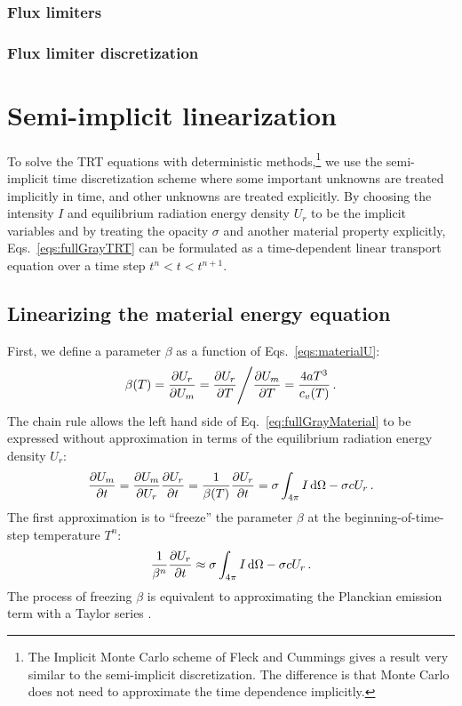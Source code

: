 \subsubsection{Flux limiters}

\subsubsection{Flux limiter discretization}
\cite{Ols2007}

\section{Semi-implicit linearization}

To solve the TRT equations with deterministic methods,\footnote{The Implicit
Monte Carlo scheme of Fleck and Cummings \cite{Fle1971} gives a result very
similar to the semi-implicit discretization. The difference is that Monte
Carlo does not need to approximate the time dependence implicitly.} we use the
semi-implicit time
discretization scheme \cite{Kno1999a,Kno2001,Low2004} where some important
unknowns are treated implicitly in
time, and other unknowns are treated explicitly. By choosing the intensity $I$
and equilibrium radiation energy density $U_r$ to be the implicit variables and 
by treating the opacity $\sigma$ and another material property explicitly,
Eqs.~\eqref{eqs:fullGrayTRT} can be formulated as a time-dependent linear
transport equation over a time step $t^n < t < t^{n+1}$.

\subsection{Linearizing the material energy equation}
First, we define a parameter $\beta$ as a function of Eqs.~\eqref{eqs:materialU}:
\begin{equation} \label{eq:beta}
  \beta(T) = \frac{\partial U_r}{\partial U_m} 
  = \frac{\partial U_r}{\partial T} \Bigg/ \frac{\partial U_m}{\partial T}
  = \frac{4 a T^3}{c_v(T)} \,.
\end{equation}
The chain rule allows the left hand side of Eq.~\eqref{eq:fullGrayMaterial} to be
expressed without approximation in terms of the equilibrium radiation energy
density $U_r$:
\begin{equation*}
  \frac{\partial U_m}{\partial t} = \frac{\partial U_m}{\partial U_r} \frac{\partial U_r}{\partial t} = \frac{1}{\beta(T)}
  \frac{\partial U_r}{\partial t} = \sigma \int_{4\pi}  I \mathop{}\!\mathrm{d} \Omega - \sigma c U_r \,.
\end{equation*}
The first approximation is to ``freeze'' the parameter $\beta$ at the beginning-of-time-step temperature $T^n$:
\begin{equation}\label{eq:frozenBeta}
  \frac{1}{\beta^n}
  \frac{\partial U_r}{\partial t} \approx \sigma \int_{4\pi}  I \mathop{}\!\mathrm{d} \Omega - \sigma c U_r \,.
\end{equation}
The process of freezing $\beta$ is equivalent to approximating the
Planckian emission term with a Taylor series \cite{Kno2007}.

